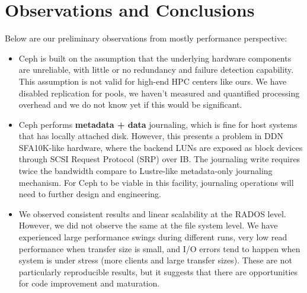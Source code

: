 \section{Observations and Conclusions}
\label{sec:conclusion}

Below are our preliminary observations from mostly performance perspective:

\begin{itemize}

  \item Ceph is built on the assumption that the underlying hardware components
are unreliable, with little or no redundancy and failure detection capability.
This assumption is not valid for high-end HPC centers like ours. We have
disabled replication for pools, we haven't measured and quantified
processing overhead and we do not know yet if this would be significant.

  \item Ceph performs \textbf{metadata + data} journaling, which is fine for
host systems that has locally attached disk. However, this presents a problem
in DDN SFA10K-like hardware, where the backend LUNs are exposed as block
devices through SCSI Request Protocol (SRP) over IB. The journaling write
requires twice the bandwidth compare to Lustre-like metadata-only journaling
mechanism. For Ceph to be viable in this facility, journaling operations will
need to further design and engineering.

  \item We observed consistent results and linear scalability at the RADOS
level. However, we did not observe the same at the file system level. We have
experienced large performance swings during different runs, very low read
performance when transfer size is small, and I/O errors tend to happen when
system is under stress (more clients and large transfer sizes). These are not
particularly reproducible results, but it suggests that there are opportunities
for code improvement and maturation.

\end{itemize}

